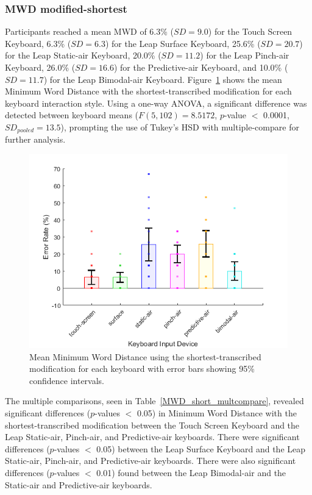 \subsubsection{MWD modified-shortest}
Participants reached a mean MWD of 6.3\% ($SD = 9.0$) for the Touch Screen Keyboard, 6.3\% ($SD = 6.3$) for the Leap Surface Keyboard, 25.6\% ($SD = 20.7$) for the Leap Static-air Keyboard, 20.0\% ($SD = 11.2$) for the Leap Pinch-air Keyboard, 26.0\% ($SD = 16.6$) for the Predictive-air Keyboard, and 10.0\% ($SD = 11.7$) for the Leap Bimodal-air Keyboard. Figure~\ref{fig_MWD_short_mean} shows the mean Minimum Word Distance with the shortest-transcribed modification for each keyboard interaction style. Using a one-way ANOVA, a significant difference was detected between keyboard means ($F(5, 102) = 8.5172$, $p$-value $<$ 0.0001, $SD_{pooled} = 13.5$), prompting the use of Tukey's HSD with multiple-compare for further analysis.

\begin{figure}[!t]
	\centering
	\includegraphics{Figures/fig_MWD_short_mean}
	\caption[Mean Minimum Word Distance for Modified-shortest]{Mean Minimum Word Distance using the shortest-transcribed modification for each keyboard with error bars showing 95\% confidence intervals.}
	\label{fig_MWD_short_mean}
\end{figure}

The multiple comparisons, seen in Table~\ref{MWD_short_multcompare}, revealed significant differences ($p$-values $<$ 0.05) in Minimum Word Distance with the shortest-transcribed modification between the Touch Screen Keyboard and the Leap Static-air, Pinch-air, and Predictive-air keyboards. There were significant differences ($p$-values $<$ 0.05) between the Leap Surface Keyboard and the Leap Static-air, Pinch-air, and Predictive-air keyboards. There were also significant differences ($p$-values $<$ 0.01) found between the Leap Bimodal-air and the Static-air and Predictive-air keyboards.

